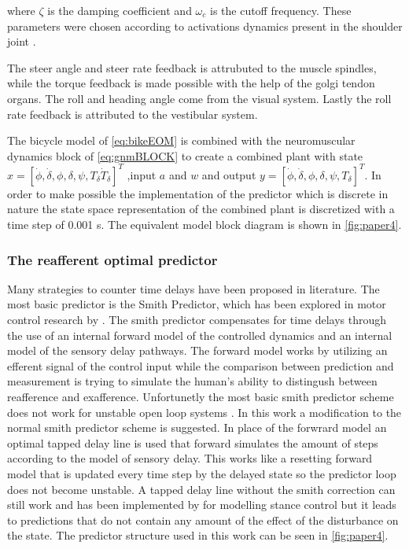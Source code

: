where \ensuremath{\zeta} is the damping coefficient and \ensuremath{\omega_c} is the cutoff frequency. These  parameters were chosen according to activations dynamics present in the shoulder joint \cite{happee2008posture}.

The steer angle and steer rate feedback is attrubuted to the muscle spindles, while the torque feedback is made possible with the help of the golgi tendon organs. The roll and heading angle come from the visual system. Lastly the roll rate feedback is attributed to the vestibular system. 

The bicycle model of \cref{eq:bikeEOM} is combined with the neuromuscular dynamics block of \cref{eq:gnmBLOCK} to create a combined  plant with state \ensuremath{x=[\dot{\phi}, \dot{\delta}, \phi, \delta, \psi, T_\delta \dot{T}_\delta]^{T}} ,input \ensuremath{a} and \ensuremath{w} and output \ensuremath{y=[\dot{\phi}, \dot{\delta}, \phi, \delta, \psi, T_\delta]^{T}}. In order to make possible the implementation of the predictor which is discrete in nature the state space representation of the combined plant is discretized with a time step of 0.001 \si{\second}. The equivalent model block diagram is shown in \cref{fig:paper4}.

\subsubsection{The reafferent optimal predictor}
Many strategies to counter time delays have been proposed in literature. The most basic predictor is the Smith Predictor, which has been explored in motor control research by \citet{miall1993cerebellum}. The smith predictor compensates for time delays through the use of an internal forward model of the controlled dynamics and an internal model of the sensory delay pathways. The forward model works by utilizing an efferent signal of the control input while the comparison between prediction and measurement is trying to simulate the human's ability to distingush between reafference and exafference.  Unfortunetly the  most basic smith predictor scheme does not work for unstable open loop systems \cite{guzman2006interactive}. In this work a modification to the normal smith predictor scheme is suggested. In place of the forwrard model an optimal tapped delay line is used that forward simulates the amount of steps according to the model of sensory delay. This works like a resetting forward model that is updated every time step by the delayed state so the predictor loop does not become unstable. A tapped delay line without the smith  correction can still work and has been implemented by \citet{van2001adaptive} for modelling stance control but it leads to predictions that do not contain any amount of the effect of the disturbance on the state. The predictor structure used in this work  can be seen in \cref{fig:paper4}.



